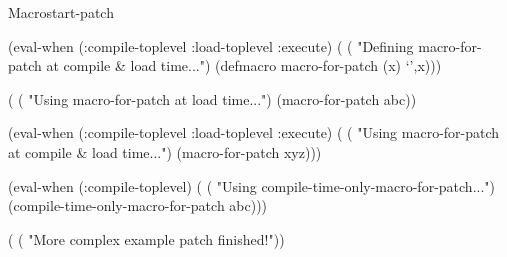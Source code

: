 \documentclass[10pt,twoside,english,pdftex]{article}
\begin{document}
\begin{functiondoc}{Macro}{start-patch}
\begin{example}
  (eval-when (:compile-toplevel :load-toplevel :execute)
    (
     ( "Defining macro-for-patch at compile & load time...")
     (defmacro macro-for-patch (x)
       `',x)))\goodpagebreak

  (
   ( "Using macro-for-patch at load time...")
   (macro-for-patch abc))

  (eval-when (:compile-toplevel :load-toplevel :execute)
    (
     ( "Using macro-for-patch at compile & load time...")
     (macro-for-patch xyz)))\goodpagebreak

  (eval-when (:compile-toplevel)
    (
     ( "Using compile-time-only-macro-for-patch...")
     (compile-time-only-macro-for-patch abc)))

  (
   ( "More complex example patch finished!"))
\end{example}

\end{functiondoc}

\end{document}
